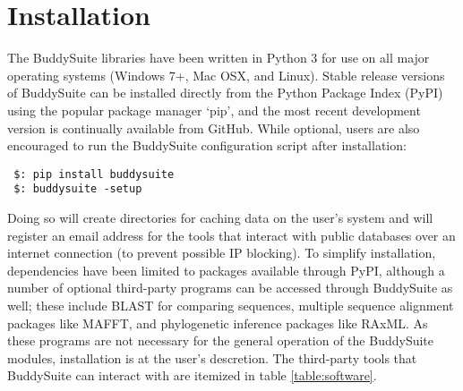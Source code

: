 \documentclass[nogrid]{MBE_article}%
\begin{document}
\section{Installation}
The BuddySuite libraries have been written in Python 3 for use on all major operating systems (Windows 7+, Mac OSX, and Linux). Stable release versions of BuddySuite can be installed directly from the Python Package Index (PyPI) using the popular package manager `pip', and the most recent development version is continually available from GitHub. While optional, users are also encouraged to run the BuddySuite configuration script after installation:

\smallskip
{\small
\begin{verbatim}
 $: pip install buddysuite
 $: buddysuite -setup
\end{verbatim}
}
\smallskip

Doing so will create directories for caching data on the user's system and will register an email address for the tools that interact with public databases over an internet connection (to prevent possible IP blocking). To simplify installation, dependencies have been limited to packages available through PyPI, although a number of optional third-party programs can be accessed through BuddySuite as well; these include BLAST for comparing sequences, multiple sequence alignment packages like MAFFT, and phylogenetic inference packages like RAxML. As these programs are not necessary for the general operation of the BuddySuite modules, installation is at the user's descretion. The third-party tools that BuddySuite can interact with are itemized in table \ref{table:software}.
\end{document}
